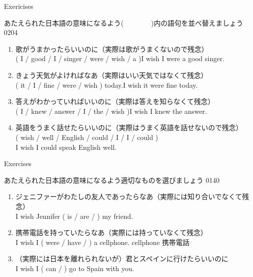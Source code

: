 \documentclass[aspectratio=169,xcolor={dvipsnames,table}]{beamer}
\begin{document}
\begin{frame}[plain]{Exericises}

 {\small あたえられた日本語の意味になるよう(~~~~~~~~)内の語句を並べ替えましょう}\mbox{}\hfill{\tiny 0204}\,{{\scriptsize {}}} 


\begin{enumerate}
 \item 歌がうまかったらいいのに{\scriptsize （実際は歌がうまくないので残念）}\\
( I / good / I / singer / were / wish / a )\hfill{}I wish I were a good singer.
 \item きょう天気がよければなあ{\scriptsize （実際はいい天気ではなくて残念）}\\
( it / I / fine / were / wish ) today.\hfill{}I wish it were fine today.
 \item 答えがわかっていればいいのに{\scriptsize （実際は答えを知らなくて残念）}\\
( I / knew / answer / I / the / wish )\hfill{}I wish I knew the answer.
 \item 英語をうまく話せたらいいのに{\scriptsize （実際はうまく英語を話せないので残念）}\\
( wish / well / English / could / I / I / could )\\
\hfill{}I wish I could speak English well.
\end{enumerate}
\end{frame}
\begin{frame}[plain]{Exercises}

 {\small あたえられた日本語の意味になるよう適切なものを選びましょう}
\hfill{\tiny 0140}\,{{\scriptsize {}}} 

\begin{enumerate}
 \item ジェニファーがわたしの友人であったらなあ{\scriptsize （実際には知り合いでなくて残念）}\\
I wish Jennifer ( is / are /  ) my friend.
 \item 携帯電話を持っていたらなあ{\scriptsize （実際には持っていなくて残念）}\\
I wish I ( were / have /  )  a cellphone.%
\hfill{\scriptsize cellphone  携帯電話}
 \item {\scriptsize （実際には日本を離れられないが）}君とスペインに行けたらいいのに\\
I wish I ( can /  ) go to Spain with you.
\end{enumerate}
\end{frame}
\end{document}
